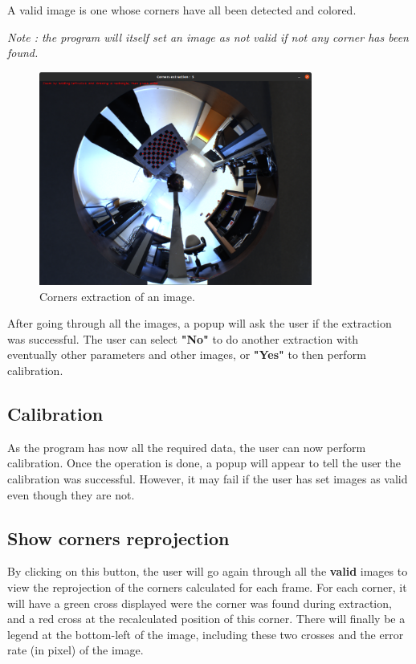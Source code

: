 \documentclass{article}
\begin{document}
A valid image is one whose corners have all been detected and colored.\bigskip

\textit{Note : the program will itself set an image as not valid if not any corner has been found.}\bigskip

\begin{figure}[H]
\centering
\includegraphics[width=0.8\textwidth]{egc.png}
\caption{\label{fig:egc}Corners extraction of an image.}
\end{figure}

After going through all the images, a popup will ask the user if the extraction was successful. The user can select \textbf{"No"} to do another extraction with eventually other parameters and other images, or \textbf{"Yes"} to then perform calibration.

\subsection{Calibration}

As the program has now all the required data, the user can now perform calibration. Once the operation is done, a popup will appear to tell the user the calibration was successful. However, it may fail if the user has set images as valid even though they are not.

\subsection{Show corners reprojection}

By clicking on this button, the user will go again through all the \textbf{valid} images to view the reprojection of the corners calculated for each frame. For each corner, it will have a green cross displayed were the corner was found during extraction, and a red cross at the recalculated position of this corner. There will finally be a legend at the bottom-left of the image, including these two crosses and the error rate (in pixel) of the image.
\end{document}
